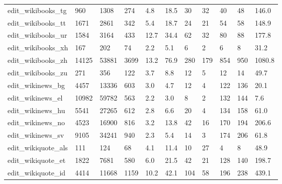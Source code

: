 \begin{longtable}{lllllllllll}
 edit\_wikibooks\_tg                                  & 960        & 1308      & 274   & 4.8    & 18.5   & 30    & 32     & 40     & 48     & 146.0   \\
 edit\_wikibooks\_tt                                  & 1671       & 2861      & 342   & 5.4    & 18.7   & 24    & 21     & 54     & 58     & 148.9   \\
 edit\_wikibooks\_ur                                  & 1584       & 3164      & 433   & 12.7   & 34.4   & 62    & 32     & 80     & 88     & 177.8   \\
 edit\_wikibooks\_xh                                  & 167        & 202       & 74    & 2.2    & 5.1    & 6     & 2      & 6      & 8      & 31.2    \\
 edit\_wikibooks\_zh                                  & 14125      & 53881     & 3699  & 13.2   & 76.9   & 280   & 179    & 854    & 950    & 1080.8  \\
 edit\_wikibooks\_zu                                  & 271        & 356       & 122   & 3.7    & 8.8    & 12    & 5      & 12     & 14     & 49.7    \\
 edit\_wikinews\_bg                                   & 4457       & 13336     & 603   & 3.0    & 4.7    & 12    & 4      & 122    & 136    & 20.1    \\
 edit\_wikinews\_el                                   & 10982      & 59782     & 563   & 2.2    & 3.0    & 8     & 2      & 132    & 144    & 7.6     \\
 edit\_wikinews\_hu                                   & 5541       & 27265     & 612   & 2.8    & 6.6    & 20    & 4      & 134    & 158    & 61.0    \\
 edit\_wikinews\_no                                   & 4523       & 16900     & 816   & 3.2    & 13.8   & 42    & 16     & 170    & 194    & 206.6   \\
 edit\_wikinews\_sv                                   & 9105       & 34241     & 940   & 2.3    & 5.4    & 14    & 3      & 174    & 206    & 61.8    \\
 edit\_wikiquote\_als                                 & 111        & 124       & 68    & 4.1    & 11.4   & 10    & 27     & 4      & 8      & 48.9    \\
 edit\_wikiquote\_et                                  & 1822       & 7681      & 580   & 6.0    & 21.5   & 42    & 21     & 128    & 140    & 198.7   \\
 edit\_wikiquote\_id                                  & 4414       & 11668     & 1159  & 10.2   & 42.1   & 104   & 58     & 196    & 238    & 439.1   \\

\end{longtable}
